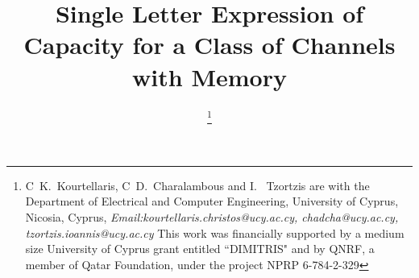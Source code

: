 \documentclass[11pt, a4paper, journal,onecolumn]{IEEEtran}
\begin{document}
%
\title{Single Letter Expression of Capacity  for a Class of Channels with Memory}


\author{
\thanks{C~K.~Kourtellaris, C~D.~Charalambous and I.~ Tzortzis are with the Department of Electrical and Computer Engineering, University of Cyprus, Nicosia, Cyprus, {\it Email:kourtellaris.christos@ucy.ac.cy, chadcha@ucy.ac.cy,  tzortzis.ioannis@ucy.ac.cy}
This work was financially supported by a medium size University of Cyprus grant entitled ``DIMITRIS"  and by QNRF, a member of Qatar Foundation, under the project NPRP 6-784-2-329}}
%



% 
\end{document}
